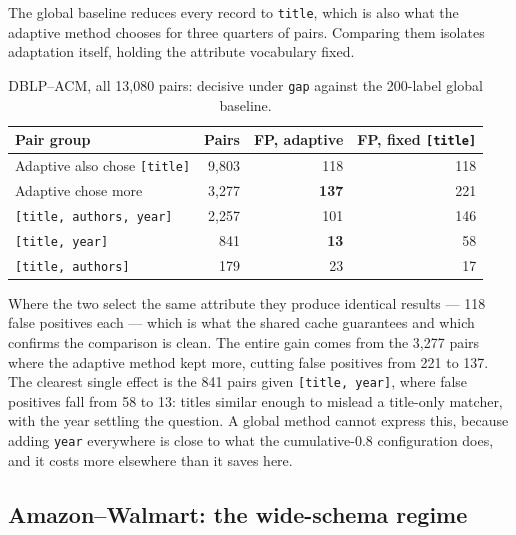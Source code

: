 \documentclass[11pt]{article}
\begin{document}
The global baseline reduces every record to \texttt{title}, which is also what the adaptive
method chooses for three quarters of pairs. Comparing them isolates adaptation itself,
holding the attribute vocabulary fixed.

\begin{table}[h]
\centering
\begin{tabular}{lrrr}
\toprule
Pair group & Pairs & FP, adaptive & FP, fixed \texttt{[title]} \\
\midrule
Adaptive also chose \texttt{[title]} & 9{,}803 & 118 & 118 \\
Adaptive chose more                  & 3{,}277 & \textbf{137} & 221 \\
\midrule
\quad \texttt{[title, authors, year]} & 2{,}257 & 101 & 146 \\
\quad \texttt{[title, year]}          &    841 &  \textbf{13} &  58 \\
\quad \texttt{[title, authors]}       &    179 &  23 &  17 \\
\bottomrule
\end{tabular}
\caption{DBLP--ACM, all 13{,}080 pairs: decisive under \texttt{gap} against the 200-label
global baseline.}
\end{table}

Where the two select the same attribute they produce identical results --- 118 false
positives each --- which is what the shared cache guarantees and which confirms the
comparison is clean. The entire gain comes from the 3{,}277 pairs where the adaptive method
kept more, cutting false positives from 221 to 137. The clearest single effect is the 841
pairs given \texttt{[title, year]}, where false positives fall from 58 to 13: titles similar
enough to mislead a title-only matcher, with the year settling the question. A global method
cannot express this, because adding \texttt{year} everywhere is close to what the
cumulative-0.8 configuration does, and it costs more elsewhere than it saves here.

\subsection{Amazon--Walmart: the wide-schema regime}
\label{sec:amazon}
\end{document}
